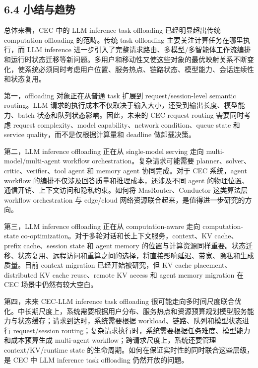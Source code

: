 \documentclass[a4paper,10pt]{ctexart}
\begin{document}
\subsection*{6.4 小结与趋势}

总体来看，CEC 中的 LLM inference task offloading 已经明显超出传统 computation offloading 的范畴。传统 task offloading 主要关注计算任务在哪里执行，而 LLM inference 进一步引入了完整请求路由、多模型/多智能体工作流编排和运行时状态迁移等新问题。多用户和移动性又使这些对象的最优映射关系不断变化，使系统必须同时考虑用户位置、服务热点、链路状态、模型能力、会话连续性和状态复用。


第一，offloading 对象正在从普通 task 扩展到 request/session-level semantic routing。LLM 请求的执行成本不仅取决于输入大小，还受到输出长度、模型能力、batch 状态和队列状态影响。因此，未来的 CEC request routing 需要同时考虑 request complexity、model capability、network condition、queue state 和 service quality，而不是仅根据计算量和 deadline 做卸载决策。


第二，LLM inference offloading 正在从 single-model serving 走向 multi-model/multi-agent workflow orchestration。复杂请求可能需要 planner、solver、critic、verifier、tool agent 和 memory agent 协同完成。对于 CEC 系统，agent workflow 的编排不仅涉及回答质量和推理成本，还涉及不同 agent 的物理位置、通信开销、上下文访问和隐私约束。如何将 MasRouter、Conductor 这类算法层 workflow orchestration 与 edge/cloud 网络资源联合起来，是值得进一步研究的方向。


第三，LLM inference offloading 正在从 computation-aware 走向 computation-state co-optimization。对于多轮对话和长上下文服务，context、KV cache、prefix cache、session state 和 agent memory 的位置与计算资源同样重要。状态迁移、状态复用、远程访问和重算之间的选择，将直接影响延迟、带宽、隐私和生成质量。目前 context migration 已经开始被研究，但 KV cache placement、distributed KV cache reuse、remote KV access 和 agent memory migration 在 CEC 场景中仍然有较大空白。


第四，未来 CEC-LLM inference task offloading 很可能走向多时间尺度联合优化。中长期尺度上，系统需要根据用户分布、服务热点和资源预算规划模型服务能力与状态缓存；请求到达时，系统需要根据 workload、链路、队列和模型状态进行 request/session routing；复杂请求执行时，系统需要根据任务难度、模型能力和成本预算生成 multi-agent workflow；跨请求尺度上，系统还要管理 context/KV/runtime state 的生命周期。如何在保证实时性的同时联合这些层级，是 CEC 中 LLM inference task offloading 仍然开放的问题。
\end{document}
